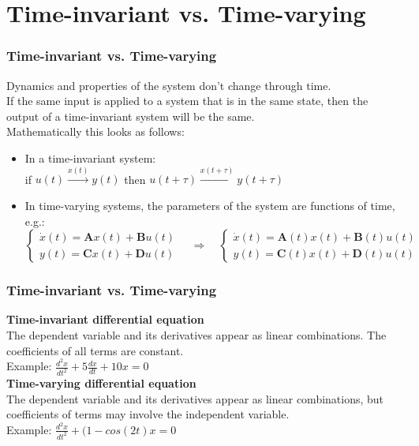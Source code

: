 \documentclass{beamer}
\begin{document}
\section{Time-invariant vs. Time-varying} 

\begin{frame}
\frametitle{Time-invariant vs. Time-varying}
Dynamics and properties of the system don't change through time.\\
If the same input is applied to a system that is in the same state, then the output of a time-invariant system will be the same.\\
\bigskip
Mathematically this looks as follows:\\
\begin{itemize}
\item In a time-invariant system:\\
if $u(t) \xrightarrow{x(t)} y(t)$ then $u(t+\tau) \xrightarrow{x(t+\tau)} y(t+\tau)$
\medskip
\item In time-varying systems, the parameters of the system are functions of time, e.g.:\\
\vspace{-2ex}
\begin{equation*}
\begin{cases}
             \dot{x}(t) = \textbf{A}x(t) + \textbf{B}u(t)\\
             y(t) = \textbf{C}x(t) + \textbf{D}u(t)
       \end{cases} \quad
\Rightarrow \quad
\begin{cases}
            \dot{x}(t) = \textbf{A}(t)x(t) + \textbf{B}(t)u(t)\\
             y(t) = \textbf{C}(t)x(t) + \textbf{D}(t)u(t)
       \end{cases}
\end{equation*}
\end{itemize}
\end{frame}


\begin{frame}
\frametitle{Time-invariant vs. Time-varying}
\vspace{-8ex}
\textbf{Time-invariant differential equation}\\
\medskip
The dependent variable and its derivatives appear as linear combinations. The coefficients of all terms are constant.\\
Example: $\frac{d^{2}x}{dt^{2}} + 5\frac{dx}{dt} + 10x=0$\\
\bigskip
\textbf{Time-varying differential equation}\\
\medskip
The dependent variable and its derivatives appear as linear combinations, but coefficients of terms may involve the independent variable.\\
Example: $\frac{d^{2}x}{dt^{2}} + (1-cos(2t)x = 0$
\end{frame}
\end{document}
